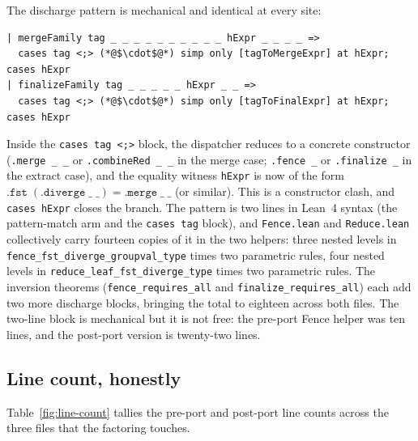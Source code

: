 \documentclass[acmsmall,screen,review,anonymous,nonacm]{acmart}
\begin{document}
The discharge pattern is mechanical and identical at every site:

\begin{lstlisting}
| mergeFamily tag _ _ _ _ _ _ _ _ _ _ hExpr _ _ _ _ =>
  cases tag <;> (*@$\cdot$@*) simp only [tagToMergeExpr] at hExpr; cases hExpr
| finalizeFamily tag _ _ _ _ _ hExpr _ _ =>
  cases tag <;> (*@$\cdot$@*) simp only [tagToFinalExpr] at hExpr; cases hExpr
\end{lstlisting}

Inside the \texttt{cases tag <;>} block, the dispatcher reduces to a concrete constructor (\texttt{.merge \_ \_} or \texttt{.combineRed \_ \_} in the merge case; \texttt{.fence \_} or \texttt{.finalize \_} in the extract case), and the equality witness \texttt{hExpr} is now of the form $\texttt{.fst}\;(\texttt{.diverge}\;\_\;\_) = \texttt{.merge}\;\_\;\_$ (or similar). This is a constructor clash, and \texttt{cases hExpr} closes the branch. The pattern is two lines in Lean~4 syntax (the pattern-match arm and the \texttt{cases tag} block), and \texttt{Fence.lean} and \texttt{Reduce.lean} collectively carry fourteen copies of it in the two helpers: three nested levels in \texttt{fence\_fst\_diverge\_groupval\_type} times two parametric rules, four nested levels in \texttt{reduce\_leaf\_fst\_diverge\_type} times two parametric rules. The inversion theorems (\texttt{fence\_requires\_all} and \texttt{finalize\_requires\_all}) each add two more discharge blocks, bringing the total to eighteen across both files. The two-line block is mechanical but it is not free: the pre-port Fence helper was ten lines, and the post-port version is twenty-two lines.

\subsection{Line count, honestly}\label{sec:line-count}

Table~\ref{fig:line-count} tallies the pre-port and post-port line counts across the three files that the factoring touches.
\end{document}
